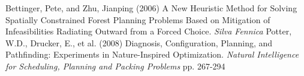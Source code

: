 \documentclass[12pt,fleqn]{article}
\begin{document}
\begin{thebibliography}{9}
Bettinger, Pete, and Zhu, Jianping (2006) A New Heuristic Method for Solving Spatially Constrained Forest Planning Problems Based on Mitigation of Infeasibilities Radiating Outward from a Forced Choice. \emph{Silva Fennica}
Potter, W.D., Drucker, E., et al. (2008) Diagnosis, Configuration, Planning, and Pathfinding: Experiments in Nature-Inspired Optimization. \emph{Natural Intelligence for Scheduling, Planning and Packing Problems} pp. 267-294 
\end{thebibliography}
\end{document}
